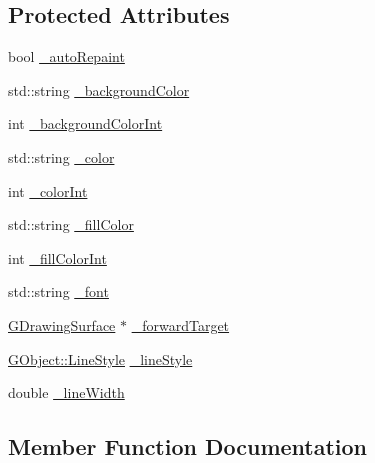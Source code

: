 \subsection*{Protected Attributes}
\begin{DoxyCompactItemize}
\item 
bool \mbox{\hyperlink{classGDrawingSurface_a738dd6afc69ac536ad46cf4d89a90933}{\+\_\+auto\+Repaint}}
\item 
std\+::string \mbox{\hyperlink{classGDrawingSurface_ad233544ea51cf6b435a199f3e3790607}{\+\_\+background\+Color}}
\item 
int \mbox{\hyperlink{classGDrawingSurface_abb8452ab4f23ecf455b9e021bf09ef91}{\+\_\+background\+Color\+Int}}
\item 
std\+::string \mbox{\hyperlink{classGDrawingSurface_a1134e770ae4315ea8bc1201e2f21da8b}{\+\_\+color}}
\item 
int \mbox{\hyperlink{classGDrawingSurface_a003fdd343d9b7505c53a8b7a134200ed}{\+\_\+color\+Int}}
\item 
std\+::string \mbox{\hyperlink{classGDrawingSurface_a179f8d6cee65cd8a54692e32b224392a}{\+\_\+fill\+Color}}
\item 
int \mbox{\hyperlink{classGDrawingSurface_a751def333a67d651e5b99cc331ecb496}{\+\_\+fill\+Color\+Int}}
\item 
std\+::string \mbox{\hyperlink{classGDrawingSurface_aea76ea1a8b5dd7b0a78653277e63b536}{\+\_\+font}}
\item 
\mbox{\hyperlink{classGDrawingSurface}{G\+Drawing\+Surface}} $\ast$ \mbox{\hyperlink{classGDrawingSurface_acbb02fa2a4a51a450fd1cc64dfc39ddd}{\+\_\+forward\+Target}}
\item 
\mbox{\hyperlink{classGObject_a86e0f5648542856159bb40775c854aa7}{G\+Object\+::\+Line\+Style}} \mbox{\hyperlink{classGDrawingSurface_ae15d02c66691247a6824dc5943a620e2}{\+\_\+line\+Style}}
\item 
double \mbox{\hyperlink{classGDrawingSurface_a16e9033665937f13de2e163dc2184aff}{\+\_\+line\+Width}}
\end{DoxyCompactItemize}


\subsection{Member Function Documentation}
\mbox{\label{classGDrawingSurface_a3a690bcb2d62250c9e4722ad7c1b9ab6}} 
